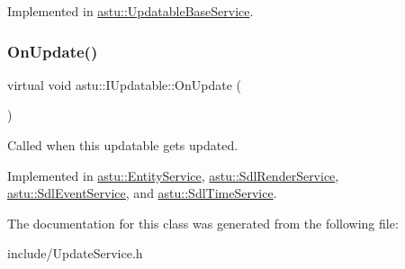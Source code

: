 Implemented in \hyperlink{classastu_1_1UpdatableBaseService_a22a9824510d94fa97efb962ae38be945}{astu\+::\+Updatable\+Base\+Service}.

\mbox{\label{classastu_1_1IUpdatable_a76c7c6e2a71b725bbdbdf6808ef4743f}} 
\subsubsection{\texorpdfstring{On\+Update()}{OnUpdate()}}
{\footnotesize\ttfamily virtual void astu\+::\+I\+Updatable\+::\+On\+Update (\begin{DoxyParamCaption}{ }\end{DoxyParamCaption})\hspace{0.3cm}{\ttfamily [pure virtual]}}

Called when this updatable gets updated. 

Implemented in \hyperlink{classastu_1_1EntityService_a70831a8dc185652c2c9056c4e3cc10e0}{astu\+::\+Entity\+Service}, \hyperlink{classastu_1_1SdlRenderService_af109517e98ab8bce1e625122a441fb75}{astu\+::\+Sdl\+Render\+Service}, \hyperlink{classastu_1_1SdlEventService_a67090f42250433506b8bfb4254df9e50}{astu\+::\+Sdl\+Event\+Service}, and \hyperlink{classastu_1_1SdlTimeService_ada8347f0f665616a2202919e71b76302}{astu\+::\+Sdl\+Time\+Service}.



The documentation for this class was generated from the following file\+:\begin{DoxyCompactItemize}
\item 
include/Update\+Service.\+h\end{DoxyCompactItemize}
